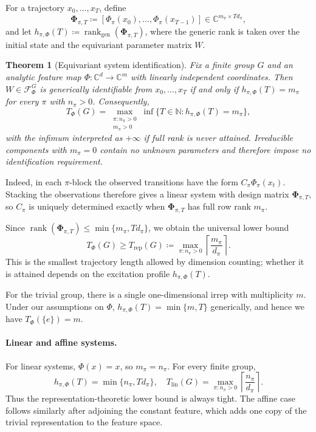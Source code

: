 \documentclass[11pt]{article}
\theoremstyle{plain}
\newtheorem{theorem}{Theorem}[section]
\theoremstyle{definition}
\theoremstyle{remark}
\begin{document}
For a trajectory \(x_0,\ldots,x_T\), define
\[
\mathbf{\Phi}_{\pi,T}
\coloneqq
[\Phi_\pi(x_0),\ldots,\Phi_\pi(x_{T-1})]
\in\mathbb C^{m_\pi\times Td_\pi},
\]
and let
\(h_{\pi,\Phi}(T)\coloneqq
\operatorname{rank}_{\mathrm{gen}}(\mathbf{\Phi}_{\pi,T})\),
where the generic rank is taken over the initial state and the equivariant
parameter matrix \(W\).

 
\begin{theorem}[Equivariant system identification]
\label{thm:equivariant_identification}
Fix a finite group \(G\) and an analytic feature map
\(\Phi:\mathbb C^d\to\mathbb C^m\) with linearly independent coordinates.
Then \(W\in\mathcal F_\Phi^G\) is generically identifiable from
\(x_0,\ldots,x_T\) if and only if \(h_{\pi,\Phi}(T)=m_\pi\) for every
\(\pi\) with \(n_\pi>0\). Consequently,
\[
T_\Phi(G)=
\max_{\substack{\pi:n_\pi>0\\ m_\pi>0}}
\inf\{T\in\mathbb N:h_{\pi,\Phi}(T)=m_\pi\},
\]
with the infimum interpreted as \(+\infty\) if full rank is never attained.
Irreducible components with \(m_\pi=0\) contain no unknown parameters and
therefore impose no identification requirement.
\end{theorem}


Indeed, in each \(\pi\)-block the observed transitions have the form
\(C_\pi\Phi_\pi(x_t)\). Stacking the observations therefore gives a linear
system with design matrix \(\mathbf{\Phi}_{\pi,T}\), so \(C_\pi\) is uniquely
determined exactly when \(\mathbf{\Phi}_{\pi,T}\) has full row rank \(m_\pi\).

Since
\(\operatorname{rank}(\mathbf{\Phi}_{\pi,T})
\le\min\{m_\pi,Td_\pi\}\), we obtain the universal lower bound
\[
T_\Phi(G)\ge
T_{\mathrm{rep}}(G)
\coloneqq
\max_{\pi:n_\pi>0}
\left\lceil\frac{m_\pi}{d_\pi}\right\rceil.
\]
This is the smallest trajectory length allowed by dimension counting; whether
it is attained depends on the excitation profile \(h_{\pi,\Phi}(T)\).

For the trivial group, there is a single one-dimensional irrep with
multiplicity \(m\). Under our assumptions on \(\Phi\),
\(h_{\pi,\Phi}(T)=\min\{m,T\}\) generically, and hence we have
\(T_\Phi(\{e\})=m\).

\paragraph{Linear and affine systems.}
For linear systems, \(\Phi(x)=x\), so \(m_\pi=n_\pi\). For every finite group,
\[
h_{\pi,\Phi}(T)=\min\{n_\pi,Td_\pi\},
\quad
T_{\mathrm{lin}}(G)=
\max_{\pi:n_\pi>0}
\left\lceil\frac{n_\pi}{d_\pi}\right\rceil.
\]
Thus the representation-theoretic lower bound is always tight. The affine case
follows similarly after adjoining the constant feature, which adds one copy of
the trivial representation to the feature space.
\end{document}
